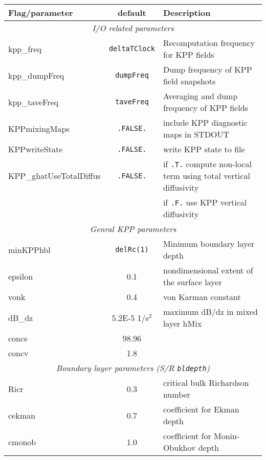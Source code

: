 \begin{table}[h!]
\centering
  \label{tab:pkg:kpp:runtime_flags}
  {\footnotesize
    \begin{tabular}{|l|c|l|}
      \hline 
      \textbf{Flag/parameter} & \textbf{default} &  \textbf{Description}  \\
      \hline \hline
         \multicolumn{3}{|c|}{\textit{I/O related parameters} } \\
         \hline
        kpp\_freq & \texttt{deltaTClock} & 
           Recomputation frequency for KPP fields \\
        kpp\_dumpFreq & \texttt{dumpFreq} & 
           Dump frequency of KPP field snapshots \\
        kpp\_taveFreq & \texttt{taveFreq} & 
           Averaging and dump frequency of KPP fields \\
        KPPmixingMaps & \texttt{.FALSE.} & 
           include KPP diagnostic maps in STDOUT \\
        KPPwriteState & \texttt{.FALSE.} & 
           write KPP state to file \\
        KPP\_ghatUseTotalDiffus & \texttt{.FALSE.} & 
           if \texttt{.T.} compute non-local term using total vertical diffusivity \\
        ~ & ~ &
           if \texttt{.F.} use KPP vertical diffusivity \\
      \hline
      \multicolumn{3}{|c|}{\textit{Genral KPP parameters} } \\
      \hline
        minKPPhbl & \texttt{delRc(1)} & 
           Minimum boundary layer depth \\
        epsilon & 0.1 & 
           nondimensional extent of the surface layer \\
        vonk & 0.4 & 
           von Karman constant \\
        dB\_dz & 5.2E-5 1/s$^2$ & 
           maximum dB/dz in mixed layer hMix \\
        concs & 98.96 &
           ~ \\
        concv & 1.8 &
           ~ \\
      \hline
      \multicolumn{3}{|c|}{\textit{Boundary layer parameters (S/R \texttt{bldepth})} } \\
      \hline
        Ricr & 0.3 & 
           critical bulk Richardson number \\
        cekman & 0.7 & 
           coefficient for Ekman depth \\
        cmonob & 1.0 & 
           coefficient for Monin-Obukhov depth \\

\end{tabular}}
\end{table}

